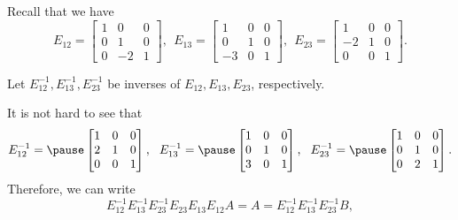 \begin{frame}
  Recall that we have
  \[
  E_{12}=
  \begin{bmatrix}
  1 & 0 & 0 \\
  0 & 1 & 0 \\
  0 & -2 & 1
\end{bmatrix}, \ \ 
E_{13}=
\begin{bmatrix}
  1 & 0 & 0 \\
  0 & 1 & 0 \\
  -3 & 0 & 1
\end{bmatrix}, \ \
E_{23}=
\begin{bmatrix}
  1 & 0 & 0 \\
  -2 & 1 & 0 \\
  0 & 0 & 1
\end{bmatrix}.
  \]

  Let $E_{12}^{-1}, E_{13}^{-1}, E_{23}^{-1}$ be inverses of $E_{12},
  E_{13}, E_{23}$, respectively.

It is not hard to see that
\[
E_{12}^{-1} = \pause
\begin{bmatrix}
  1 & 0 & 0 \\
  2 & 1 & 0 \\
  0 & 0 & 1
\end{bmatrix}, \ \ 
E_{13}^{-1} = \pause
\begin{bmatrix}
  1 & 0 & 0 \\
  0 & 1 & 0 \\
  3 & 0 & 1
\end{bmatrix}, \ \ 
E_{23}^{-1} = \pause
\begin{bmatrix}
  1 & 0 & 0 \\
  0 & 1 & 0 \\
  0 & 2 & 1
\end{bmatrix}.
\]
Therefore, we can write
\[
E_{12}^{-1}E_{13}^{-1}E_{23}^{-1}
E_{23}E_{13}E_{12}A = A =
E_{12}^{-1}E_{13}^{-1}E_{23}^{-1}
B,
\]

\end{frame}
